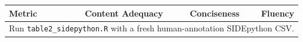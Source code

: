 \begin{tabular}{lrrr}
\hline
Metric & Content Adequacy & Conciseness & Fluency \\
\hline
\multicolumn{4}{l}{Run \texttt{table2\_sidepython.R} with a fresh human-annotation SIDEpython CSV.} \\
\hline
\end{tabular}

